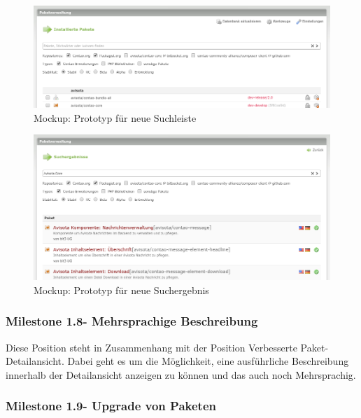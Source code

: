 \documentclass[
paper=a4,
draft=false,%
fontsize=10pt%
]{scrartcl}
\begin{document}
\begin{figure}[p]
  \centering
  \includegraphics[width=\textwidth]{bilder/mockup-search-bar}
  \caption{Mockup: Prototyp für neue Suchleiste}
\end{figure}

\begin{figure}[p]
  \centering
  \includegraphics[width=\textwidth]{bilder/mockup-search-result}
  \caption{Mockup: Prototyp für neue Suchergebnis}
\end{figure}

\pagebreak

\subsubsection[Milestone 1.8 - Mehrsprachige Beschreibung]{Milestone 1.8\footnotemark - Mehrsprachige Beschreibung}
\label{subsec:ccc-milestone-1.8}

Diese Position steht in Zusammenhang mit der Position Verbesserte Paket-Detailansicht. Dabei geht es um die Möglichkeit, eine ausführliche Beschreibung innerhalb der Detailansicht anzeigen zu können und das auch noch Mehrsprachig.

\subsubsection[Milestone 1.9 - Upgrade von Paketen]{Milestone 1.9\footnotemark - Upgrade von Paketen}
\label{subsec:ccc-milestone-1.9}
\end{document}
